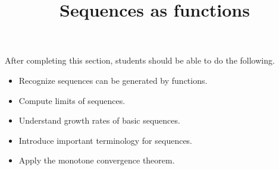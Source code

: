 \documentclass{ximera}
\title{Sequences as functions}
\begin{document}
\begin{abstract}
\end{abstract}

\maketitle

\begin{sectionOutcomes}

After completing this section, students should be able to do the following.

\begin{itemize}
\item{Recognize sequences can be generated by functions.}
\item{Compute limits of sequences.}
\item{Understand growth rates of basic sequences.}
\item{Introduce important terminology for sequences.}
\item{Apply the monotone convergence theorem.}
\end{itemize}

\end{sectionOutcomes}
\end{document}
